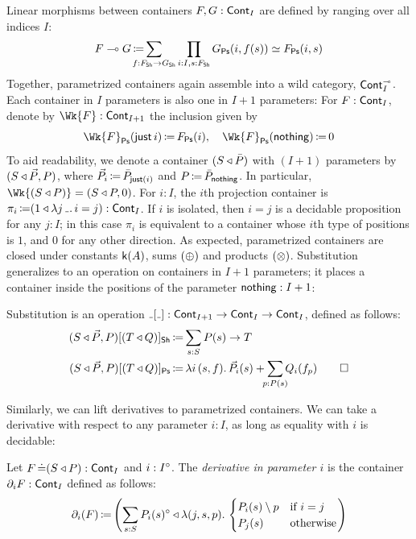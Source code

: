 Linear morphisms between containers \(F , G : \operatorname{\mathsf{Cont}}_{I} \) are defined by ranging over all indices \( I \):
\[
  \Cart{F}{G} \DefEq \smashoperator[l]{\sum_{f : F_{\Sh} \to G_{\Sh}}} \prod_{i : I, s : F_{\Sh}} G_{\Ps}(i, f(s)) \simeq F_{\Ps}(i, s)
\]
Together, parametrized containers again assemble into a wild category, \( \operatorname{\operatorname{\mathsf{Cont}}}^{{\scriptscriptstyle\multimap}}_{I} \).
Each container in \( I \) parameters is also one in \( I + 1 \) parameters:
For \( F : \operatorname{\mathsf{Cont}}_{I} \), denote by \( \Wk{F} : \ICont{I+1} \) the inclusion given by
\[
  \Wk{F}_{\Ps}(\Just{i}) \DefEq F_{\Ps}(i), \quad \Wk{F}_{\Ps}(\Nothing) \DefEq 0
\]
To aid readability, we denote a container \( (S\mathbin{\triangleleft}\bar{P}) \) with \( (I+1) \) parameters by \( (S\mathbin{\triangleleft}\vec{P}, P) \),
where \( \vec{P}_i \operatorname{\mathrel{\coloneq}} \bar{P}_{\operatorname{\mathsf{just}}(i)} \) and \( P \operatorname{\mathrel{\coloneq}} \bar{P}_{\operatorname{\mathsf{nothing}}} \).
In particular, \( \Wk{(\MkCont{S}{P})} = (\MkCont{S}{P,0}) \).
For \( i : I \), the \( i \)th projection container is \( \pi_i \DefEq (\MkCont{1}{\lambda j\,\Blank.\,{i = j}}) : \ICont{I} \).
If \( i \) is isolated, then \( i = j \) is a decidable proposition for any \( j : I \);
in this case \( \pi_i \) is equivalent to a container whose \( i \)th type of positions is \( 1 \),
and \( 0 \) for any other direction.
As expected, parametrized containers are closed under constants \( \mathsf{k}(A) \), sums \( (\mathbin{\oplus}) \) and products \( (\mathbin{\otimes}) \).
Substitution generalizes to an operation on containers in \( I + 1 \) parameters;
it places a container inside the positions of the parameter \( \operatorname{\mathsf{nothing}} : I + 1 \):
\begin{definition}
    Substitution is an operation \( \Subst{\Blank}{\Blank} : \ICont{I+1} \to \ICont{I} \to \ICont{I} \),
    defined as follows:
    \begin{align*}
      \Subst{(\MkCont{S}{\vec{P}, P})}{(\MkCont{T}{Q})}_{\Sh} &\DefEq \sum_{s : S} P(s) \to T
        \\
      \Subst{(\MkCont{S}{\vec{P}, P})}{(\MkCont{T}{Q})}_{\Ps} &\DefEq \lambda i\, (s, f).\, \vec{P}_i(s) + \smashoperator{\sum_{p : P(s)}} Q_i(f_p)
        \qedhere
    \end{align*}
\end{definition}
Similarly, we can lift derivatives to parametrized containers.
We can take a derivative with respect to any parameter \( i : I \), as long as equality with \( i \) is decidable:
\begin{definition}
  Let \( F \operatorname{\mathrel{\doteq}} (S\mathbin{\triangleleft}P) : \operatorname{\mathsf{Cont}}_{I} \) and \( i : I^{\circ} \).
  The \emph{derivative in parameter \( i \)} is the container \( {\partial_i}F : \operatorname{\mathsf{Cont}}_{I} \) defined as follows:
  \[
    {\Der_i(F)} \DefEq \left(
      \MkCont%
        {\sum_{s : S} \Isolated{P_i(s)}}%
        {\lambda (j , s , p)\Where
          \begin{cases}
            P_i(s) \setminus p & \text{if } i = j \\
            P_j(s) & \text{otherwise}
          \end{cases}
        }%
    \right)
  \]
\end{definition}

